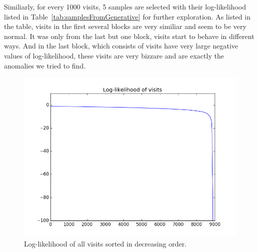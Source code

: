 Similiarly, for every 1000 visits, 5 samples are selected with their log-likelihood listed in Table~\ref{tab:samplesFromGenerative} for further exploration. As listed in the table, visits in the first several blocks are very similiar and seem to be very normal. It was only from the last but one block, visits start to behave in different ways. And in the last block, which consists of visits have very large negative values of log-likelihood, these visits are very bizzare and are exactly the anomalies we tried to find.

\begin{figure}[!ht]
	\begin{center}
		\includegraphics[width=\textwidth]{images/likelihood}
		\caption{Log-likelihood of all visits sorted in decreasing order.}
		\label{fig:likelihood}
	\end{center}
\end{figure}

